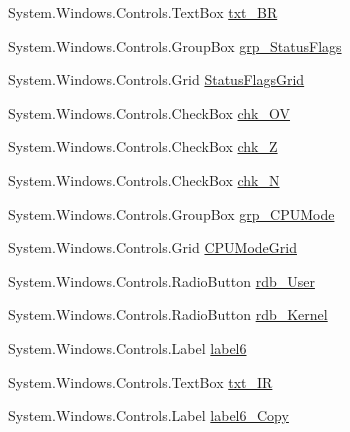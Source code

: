 \begin{DoxyCompactItemize}
\item 
System.\+Windows.\+Controls.\+Text\+Box \hyperlink{class_c_p_u___o_s___simulator_1_1_main_window_a7a878022ed4cb948598d3685dc821a00}{txt\+\_\+\+B\+R}
\item 
System.\+Windows.\+Controls.\+Group\+Box \hyperlink{class_c_p_u___o_s___simulator_1_1_main_window_a9947d1946c8258ea1fb77d860baa7e0f}{grp\+\_\+\+Status\+Flags}
\item 
System.\+Windows.\+Controls.\+Grid \hyperlink{class_c_p_u___o_s___simulator_1_1_main_window_afdda5e5a39c6e3b99300284ea2640e7c}{Status\+Flags\+Grid}
\item 
System.\+Windows.\+Controls.\+Check\+Box \hyperlink{class_c_p_u___o_s___simulator_1_1_main_window_adfbc519740506214093673b8015ea67d}{chk\+\_\+\+O\+V}
\item 
System.\+Windows.\+Controls.\+Check\+Box \hyperlink{class_c_p_u___o_s___simulator_1_1_main_window_a70c1a75df218201391cf5e0615a600f1}{chk\+\_\+\+Z}
\item 
System.\+Windows.\+Controls.\+Check\+Box \hyperlink{class_c_p_u___o_s___simulator_1_1_main_window_ab8a23e33c5c71e359574de36ccf8d991}{chk\+\_\+\+N}
\item 
System.\+Windows.\+Controls.\+Group\+Box \hyperlink{class_c_p_u___o_s___simulator_1_1_main_window_a0e549bad0f6778b2ea3fffb6c2d1a2bb}{grp\+\_\+\+C\+P\+U\+Mode}
\item 
System.\+Windows.\+Controls.\+Grid \hyperlink{class_c_p_u___o_s___simulator_1_1_main_window_ab6afb45d3f05517e9df6af167752be77}{C\+P\+U\+Mode\+Grid}
\item 
System.\+Windows.\+Controls.\+Radio\+Button \hyperlink{class_c_p_u___o_s___simulator_1_1_main_window_ab9e8d52c337bc24a24d8282dfbf449c8}{rdb\+\_\+\+User}
\item 
System.\+Windows.\+Controls.\+Radio\+Button \hyperlink{class_c_p_u___o_s___simulator_1_1_main_window_a549c6be690b051f4ab15dce643dec656}{rdb\+\_\+\+Kernel}
\item 
System.\+Windows.\+Controls.\+Label \hyperlink{class_c_p_u___o_s___simulator_1_1_main_window_a8f210008776bb163b4c2c2b160aa52be}{label6}
\item 
System.\+Windows.\+Controls.\+Text\+Box \hyperlink{class_c_p_u___o_s___simulator_1_1_main_window_ac6e0cfcdd72688d7bffd100ce6d11a28}{txt\+\_\+\+I\+R}
\item 
System.\+Windows.\+Controls.\+Label \hyperlink{class_c_p_u___o_s___simulator_1_1_main_window_a18612502a8ab2d53d85434e426785022}{label6\+\_\+\+Copy}
\item 

\end{DoxyCompactItemize}
